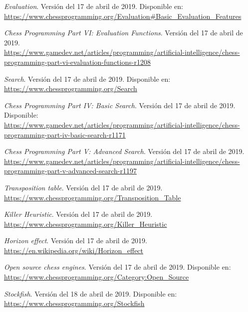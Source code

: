 \documentclass[letterpaper,12pt]{article}
\begin{document}
\begin{thebibliography}{99}
\textit{Evaluation}. Versión del 17 de abril de 2019. Disponible en: \\
\url{https://www.chessprogramming.org/Evaluation#Basic_Evaluation_Features}

\textit{Chess Programming Part VI: Evaluation Functions}. Versión del 17 de abril de 2019.
\\ \url{https://www.gamedev.net/articles/programming/artificial-intelligence/chess-programming-part-vi-evaluation-functions-r1208}

\textit{Search}. Versión del 17 de abril de 2019. Disponible en: \\
\url{https://www.chessprogramming.org/Search}

\textit{Chess Programming Part IV: Basic Search}. Versión del 17 de abril de 2019.
Disponible: \\ \url{https://www.gamedev.net/articles/programming/artificial-intelligence/chess-programming-part-iv-basic-search-r1171}

\textit{Chess Programming Part V: Advanced Search}. Versión del 17 de abril de 2019. \\
\url{https://www.gamedev.net/articles/programming/artificial-intelligence/chess-programming-part-v-advanced-search-r1197}

\textit{Transposition table}. Versión del 17 de abril de 2019. \\
\url{https://www.chessprogramming.org/Transposition_Table}

\textit{Killer Heuristic}. Versión del 17 de abril de 2019. \\
\url{https://www.chessprogramming.org/Killer_Heuristic}

\textit{Horizon effect}. Versión del 17 de abril de 2019. \\
\url{https://en.wikipedia.org/wiki/Horizon_effect}



\textit{Open source chess engines}. Versión del 17 de abril de 2019. Disponible en: \\
\url{https://www.chessprogramming.org/Category:Open_Source}

\textit{Stockfish}. Versión del 18 de abril de 2019. Disponible en: \\
\url{https://www.chessprogramming.org/Stockfish}

\end{thebibliography}
\end{document}
